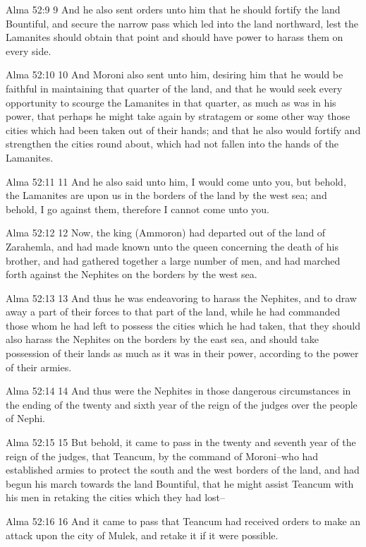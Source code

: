 Alma 52:9
 9 And he also sent orders unto him that he should fortify the
land Bountiful, and secure the narrow pass which led into the
land northward, lest the Lamanites should obtain that point and
should have power to harass them on every side.

Alma 52:10
 10 And Moroni also sent unto him, desiring him that he would be
faithful in maintaining that quarter of the land, and that he
would seek every opportunity to scourge the Lamanites in that
quarter, as much as was in his power, that perhaps he might take
again by stratagem or some other way those cities which had been
taken out of their hands; and that he also would fortify and
strengthen the cities round about, which had not fallen into the
hands of the Lamanites.

Alma 52:11
 11 And he also said unto him, I would come unto you, but behold,
the Lamanites are upon us in the borders of the land by the west
sea; and behold, I go against them, therefore I cannot come unto
you.

Alma 52:12
 12 Now, the king (Ammoron) had departed out of the land of
Zarahemla, and had made known unto the queen concerning the death
of his brother, and had gathered together a large number of men,
and had marched forth against the Nephites on the borders by the
west sea.

Alma 52:13
 13 And thus he was endeavoring to harass the Nephites, and to
draw away a part of their forces to that part of the land, while
he had commanded those whom he had left to possess the cities
which he had taken, that they should also harass the Nephites on
the borders by the east sea, and should take possession of their
lands as much as it was in their power, according to the power of
their armies.

Alma 52:14
 14 And thus were the Nephites in those dangerous circumstances
in the ending of the twenty and sixth year of the reign of the
judges over the people of Nephi.

Alma 52:15
 15 But behold, it came to pass in the twenty and seventh year of
the reign of the judges, that Teancum, by the command of
Moroni--who had established armies to protect the south and the
west borders of the land, and had begun his march towards the
land Bountiful, that he might assist Teancum with his men in
retaking the cities which they had lost--

Alma 52:16
 16 And it came to pass that Teancum had received orders to make
an attack upon the city of Mulek, and retake it if it were
possible.


